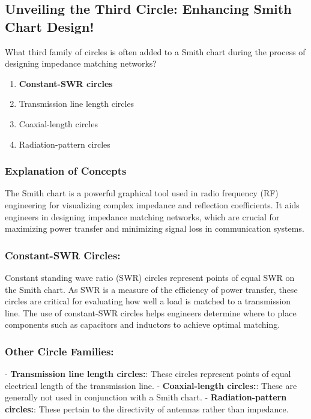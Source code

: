 \subsection{Unveiling the Third Circle: Enhancing Smith Chart Design!}

\begin{tcolorbox}[colback=gray!10, colframe=black, title=E9G09] What third family of circles is often added to a Smith chart during the process of designing impedance matching networks?
\begin{enumerate}[label=\Alph*.]
    \item \textbf{Constant-SWR circles}
    \item Transmission line length circles
    \item Coaxial-length circles
    \item Radiation-pattern circles
\end{enumerate} \end{tcolorbox}

\subsubsection{Explanation of Concepts}

The Smith chart is a powerful graphical tool used in radio frequency (RF) engineering for visualizing complex impedance and reflection coefficients. It aids engineers in designing impedance matching networks, which are crucial for maximizing power transfer and minimizing signal loss in communication systems.

\subsubsection*{Constant-SWR Circles:}
Constant standing wave ratio (SWR) circles represent points of equal SWR on the Smith chart. As SWR is a measure of the efficiency of power transfer, these circles are critical for evaluating how well a load is matched to a transmission line. The use of constant-SWR circles helps engineers determine where to place components such as capacitors and inductors to achieve optimal matching.

\subsubsection*{Other Circle Families:}
- \textbf{Transmission line length circles:}: These circles represent points of equal electrical length of the transmission line.
- \textbf{Coaxial-length circles:}: These are generally not used in conjunction with a Smith chart.
- \textbf{Radiation-pattern circles:}: These pertain to the directivity of antennas rather than impedance.

